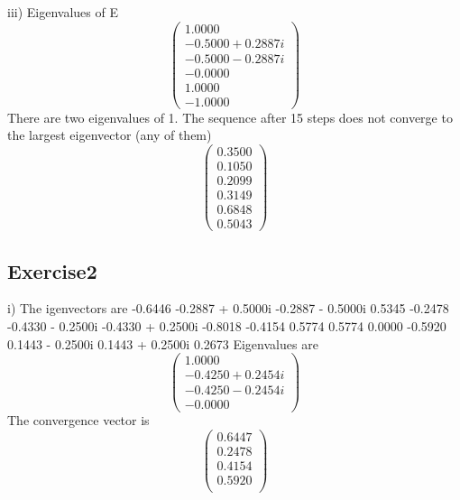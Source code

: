 \documentclass{article} %
\begin{document}
iii) Eigenvalues of E    
  \[ \left( \begin{array}{c}  
 1.0000          \\
  -0.5000 + 0.2887i\\
  -0.5000 - 0.2887i\\
  -0.0000          \\
   1.0000          \\
  -1.0000   \end{array} \right)\]        
  There are two eigenvalues of 1.
  The sequence after 15 steps does not converge to the largest eigenvector (any of them)
   \[ \left( \begin{array}{c}   
    0.3500\\
    0.1050\\
    0.2099\\
    0.3149\\
    0.6848\\
    0.5043\end{array} \right)\]        



\subsection{Exercise2}
i)  
The igenvectors are
 -0.6446            -0.2887 + 0.5000i  -0.2887 - 0.5000i   0.5345          
  -0.2478            -0.4330 - 0.2500i  -0.4330 + 0.2500i  -0.8018          
  -0.4154             0.5774             0.5774             0.0000          
  -0.5920             0.1443 - 0.2500i   0.1443 + 0.2500i   0.2673          
Eigenvalues are 
   \[ \left( \begin{array}{c}   
   1.0000          \\
  -0.4250 + 0.2454i \\
  -0.4250 - 0.2454i \\
  -0.0000         \end{array} \right)\]         
The convergence vector is 
   \[ \left( \begin{array}{c}   
    0.6447\\
    0.2478\\
    0.4154\\
    0.5920\\
\end{array} \right)\]        
\end{document}
